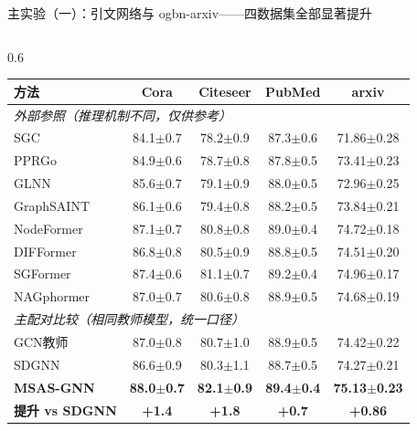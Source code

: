 \documentclass[aspectratio=169,9pt,xcolor=dvipsnames]{beamer}
\newcommand{\green}[1]{\textcolor{mygreen}{#1}}
\begin{document}
\begin{frame}{主实验（一）：引文网络与 ogbn-arxiv——四数据集全部显著提升}
\begin{columns}[T]

\begin{column}{0.6\textwidth}
  \begin{tabular}{lcccc}
    \toprule
    \textbf{方法} & \textbf{Cora} & \textbf{Citeseer} & \textbf{PubMed} & \textbf{arxiv} \\
    \midrule
    \multicolumn{5}{l}{\textit{外部参照（推理机制不同，仅供参考）}}\\
    SGC & 84.1\small{$\pm$0.7} & 78.2\small{$\pm$0.9} & 87.3\small{$\pm$0.6} & 71.86\small{$\pm$0.28} \\
    PPRGo & 84.9\small{$\pm$0.6} & 78.7\small{$\pm$0.8} & 87.8\small{$\pm$0.5} & 73.41\small{$\pm$0.23} \\
    GLNN & 85.6\small{$\pm$0.7} & 79.1\small{$\pm$0.9} & 88.0\small{$\pm$0.5} & 72.96\small{$\pm$0.25} \\
    GraphSAINT & 86.1\small{$\pm$0.6} & 79.4\small{$\pm$0.8} & 88.2\small{$\pm$0.5} & 73.84\small{$\pm$0.21} \\
    NodeFormer & 87.1\small{$\pm$0.7} & 80.8\small{$\pm$0.8} & 89.0\small{$\pm$0.4} & 74.72\small{$\pm$0.18} \\
    DIFFormer & 86.8\small{$\pm$0.8} & 80.5\small{$\pm$0.9} & 88.8\small{$\pm$0.5} & 74.51\small{$\pm$0.20} \\
    SGFormer & 87.4\small{$\pm$0.6} & 81.1\small{$\pm$0.7} & 89.2\small{$\pm$0.4} & 74.96\small{$\pm$0.17} \\
    NAGphormer & 87.0\small{$\pm$0.7} & 80.6\small{$\pm$0.8} & 88.9\small{$\pm$0.5} & 74.68\small{$\pm$0.19} \\
    \midrule
    \multicolumn{5}{l}{\textit{主配对比较（相同教师模型，统一口径）}}\\
    GCN教师 & 87.0\small{$\pm$0.8} & 80.7\small{$\pm$1.0} & 88.9\small{$\pm$0.5} & 74.42\small{$\pm$0.22} \\
    SDGNN & 86.6\small{$\pm$0.9} & 80.3\small{$\pm$1.1} & 88.7\small{$\pm$0.5} & 74.27\small{$\pm$0.21} \\
    \textbf{MSAS-GNN} & \textbf{88.0\small{$\pm$0.7}} & \textbf{82.1\small{$\pm$0.9}} & \textbf{89.4\small{$\pm$0.4}} & \textbf{75.13\small{$\pm$0.23}} \\
    \midrule
    \green{\textbf{提升 vs SDGNN}} & \green{\textbf{+1.4}} & \green{\textbf{+1.8}} & \green{\textbf{+0.7}} & \green{\textbf{+0.86}} \\
    \bottomrule
  \end{tabular}


\end{column}
\end{columns}
\end{frame}
\end{document}
